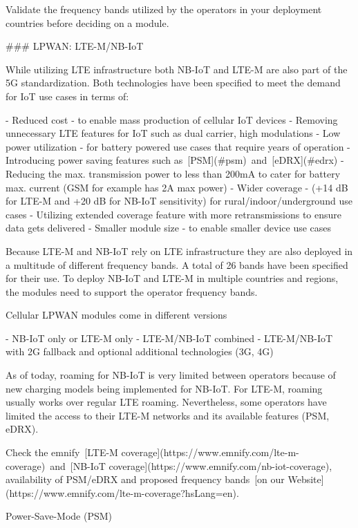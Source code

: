 \documentclass[11pt, oneside]{article}   	%
\newcommand{\addspace}{\vspace{2mm}}
\begin{document}
\begin{tcolorbox}[colback=green!5!white,colframe=green!75!black,title=Tip]
Validate the frequency bands utilized by the operators in your deployment countries before deciding on a module.
\end{tcolorbox}
\begin{markdown}

### LPWAN: LTE-M/NB-IoT

While utilizing LTE infrastructure both NB-IoT and LTE-M are also part of the 5G standardization.
Both technologies have been specified to meet the demand for IoT use cases in terms of:
\end{markdown}
\addspace
\begin{markdown}
- Reduced cost - to enable mass production of cellular IoT devices
    - Removing unnecessary LTE features for IoT such as dual carrier, high modulations
- Low power utilization - for battery powered use cases that require years of operation
    -  Introducing power saving features such as [PSM](#psm) and [eDRX](#edrx)
    -  Reducing the max. transmission power to less than 200mA to cater for battery max. current (GSM for example has 2A max power) 
- Wider coverage - (+14 dB for LTE-M and +20 dB for NB-IoT sensitivity) for rural/indoor/underground use cases
    - Utilizing extended coverage feature with more retransmissions to ensure data gets delivered 
- Smaller module size - to enable smaller device use cases
\end{markdown}
\addspace
\begin{markdown}
Because LTE-M and NB-IoT rely on LTE infrastructure they are also deployed in a multitude of different frequency bands.
A total of 26 bands have been specified for their use.
To deploy NB-IoT and LTE-M in multiple countries and regions, the modules need to support the operator frequency bands.

Cellular LPWAN modules come in different versions

- NB-IoT only or LTE-M only
- LTE-M/NB-IoT combined
- LTE-M/NB-IoT with 2G fallback and optional additional technologies (3G, 4G)

As of today, roaming for NB-IoT is very limited between operators because of new charging models being implemented for NB-IoT.
For LTE-M, roaming usually works over regular LTE roaming.
Nevertheless, some operators have limited the access to their LTE-M networks and its available features (PSM, eDRX).

Check the emnify [LTE-M coverage](https://www.emnify.com/lte-m-coverage) and [NB-IoT coverage](https://www.emnify.com/nb-iot-coverage), availability of PSM/eDRX and proposed frequency bands [on our Website](https://www.emnify.com/lte-m-coverage?hsLang=en).

Power-Save-Mode (PSM)
\end{markdown}
\end{document}
